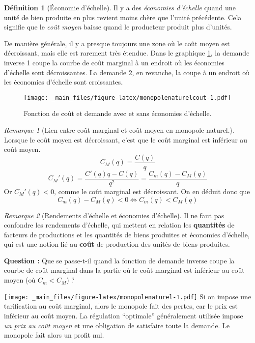 \documentclass[
  a4paper,
]{book}
\theoremstyle{definition}
\newtheorem{definition}{Définition}[chapter]
\theoremstyle{definition}
\theoremstyle{definition}
\theoremstyle{definition}
\theoremstyle{remark}
\newtheorem*{remark}{Remarque}
\begin{document}
\begin{definition}[Économie d'échelle]
Il y a des \emph{économies d'échelle} quand une unité de bien produite en plus revient moins chère que l'unité précédente.
Cela signifie que le \emph{coût moyen} baisse quand le producteur produit plus d'unités.
\end{definition}

De manière générale, il y a presque toujours une zone où le coût moyen est décroissant, mais elle est rarement très étendue.
Dans le graphique \ref{fig:monopolenaturelcout}, la demande inverse 1 coupe la courbe de coût marginal à un endroit où les économies d'échelle sont décroissantes.
La demande 2, en revanche, la coupe à un endroit où les économies d'échelle sont croissantes.

\begin{figure}
\centering
\texttt{[image: \_main\_files/figure-latex/monopolenaturelcout-1.pdf]}
\caption{\label{fig:monopolenaturelcout}Fonction de coût et demande avec et sans économies d'échelle.}
\end{figure}

\begin{remark}[Lien entre coût marginal et coût moyen en monopole naturel.]
Lorsque le coût moyen est décroissant, c'est que le coût marginal est inférieur au coût moyen.
\[
C_M(q) = \frac{C(q)}{q}
\]
\[
C_M'(q) =\frac{C'(q)q-C(q)}{q^2} = \frac{C_m(q)-C_M(q)}{q}
\]
Or \(C_M'(q)<0\), comme le coût marginal est décroissant.
On en déduit donc que
\[
C_m(q)-C_M(q)< 0 \Leftrightarrow C_m(q)<C_M(q)
\]
\end{remark}

\begin{remark}[Rendements d'échelle et économies d'échelle]
Il ne faut pas confondre les rendements d'échelle, qui mettent en relation les \textbf{quantités} de facteurs de productions et les quantités de biens produites et économies d'échelle, qui est une notion lié au \textbf{coût} de production des unités de biens produites.
\end{remark}

\textbf{Question :} Que se passe-t-il quand la fonction de demande inverse coupe la courbe de coût marginal dans la partie où le coût marginal est inférieur au coût moyen (où \(C_m<C_M\)) ?

\texttt{[image: \_main\_files/figure-latex/monopolenaturel-1.pdf]}
Si on impose une tarification au coût marginal, alors le monopole fait des pertes, car le prix est inférieur au coût moyen.
La régulation ``optimale'' généralement utilisée impose \emph{un prix au coût moyen} et une obligation de satisfaire toute la demande.
Le monopole fait alors un profit nul.
\end{document}

